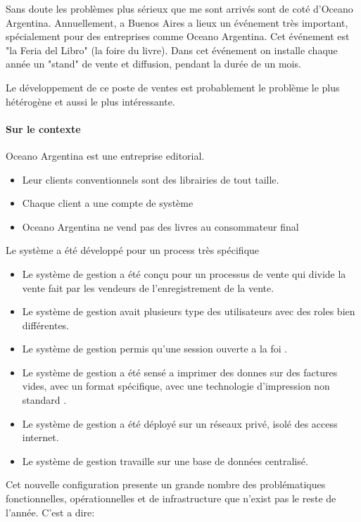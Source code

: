 \documentclass{resume} %
\begin{document}
		Sans doute les problèmes plus sérieux que me sont arrivés sont de coté d'Oceano Argentina. 
		Annuellement, a Buenos Aires a lieux un événement très important, spécialement pour des entreprises comme Oceano Argentina. Cet événement est "la Feria del Libro" (la foire du livre). 
		Dans cet événement on installe chaque année un "stand" de vente et diffusion, pendant la durée de un mois. 
		
		Le développement de ce poste de ventes est probablement le problème le plus hétérogène et aussi le plus intéressante. 
		
		\paragraph{ Sur le contexte } 
		
		Oceano Argentina est une entreprise editorial. 
		
		\begin {itemize} 
		 \item Leur clients conventionnels sont des librairies de tout taille.
		 \item Chaque client a une compte de système
		 \item Oceano Argentina ne vend pas des livres au consommateur final
		\end{itemize}
		
		Le système a été développé pour un process très spécifique 
		\begin{itemize} 
		   \item Le système de gestion a été conçu pour un processus de vente qui divide la vente fait par les vendeurs de l'enregistrement de la vente.
		   \item Le système de gestion avait plusieurs type des utilisateurs avec des roles bien différentes.
		   \item Le système de gestion permis qu'une session ouverte a la foi .
		   \item Le système de gestion a été  sensé a imprimer des donnes sur des factures vides, avec un format spécifique, avec une technologie d'impression non standard .
		   \item Le système de gestion a été déployé sur un réseaux privé, isolé des access internet.
		   \item Le système de gestion travaille sur une base de données centralisé.
		\end{itemize} 
		
		Cet nouvelle configuration presente un grande nombre des problématiques fonctionnelles, opérationnelles et de infrastructure  que n'exist pas le reste de l'année. C'est a dire: 
		
\end{document}
